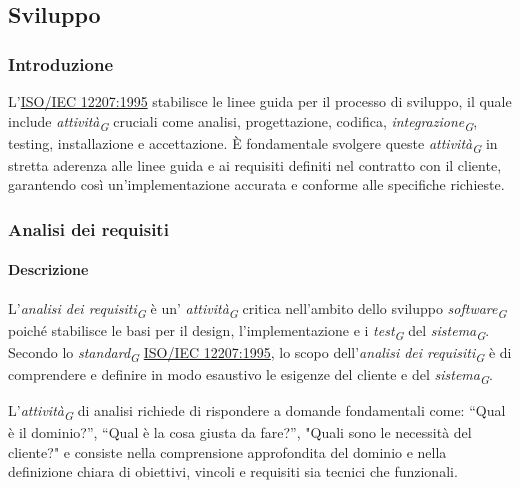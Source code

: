 \subsection{Sviluppo}

\subsubsection{Introduzione}
L'\href{https://www.math.unipd.it/~tullio/IS-1/2009/Approfondimenti/ISO_12207-1995.pdf}{ISO/IEC 12207:1995} stabilisce le linee guida per il processo di sviluppo, il quale include \textit{attività}\textsubscript{\textit{G}} cruciali come analisi, progettazione, codifica, \textit{integrazione}\textsubscript{\textit{G}}, testing, installazione e accettazione. È fondamentale svolgere queste \textit{attività}\textsubscript{\textit{G}} in stretta aderenza alle linee guida e ai requisiti definiti nel contratto con il cliente, garantendo così un'implementazione accurata e conforme alle specifiche richieste.

\subsubsection{Analisi dei requisiti}
\paragraph{Descrizione}
L'\textit{analisi dei requisiti}\textsubscript{\textit{G}} è un' \textit{attività}\textsubscript{\textit{G}} critica nell'ambito dello sviluppo \textit{software}\textsubscript{\textit{G}} poiché stabilisce le basi per il design, l'implementazione e i \textit{test}\textsubscript{\textit{G}} del \textit{sistema}\textsubscript{\textit{G}}. \\
Secondo lo \textit{standard}\textsubscript{\textit{G}} \href{https://www.math.unipd.it/~tullio/IS-1/2009/Approfondimenti/ISO_12207-1995.pdf}{ISO/IEC 12207:1995}, lo scopo dell'\textit{analisi dei requisiti}\textsubscript{\textit{G}} è di comprendere e definire in modo esaustivo le esigenze del cliente e del \textit{sistema}\textsubscript{\textit{G}}.

\vspace{0.2cm}

L’\textit{attività}\textsubscript{\textit{G}} di analisi richiede di rispondere a domande fondamentali come: “Qual è il dominio?”, “Qual è la cosa giusta da fare?”, "Quali sono le necessità del cliente?" e consiste nella comprensione approfondita del dominio e nella definizione chiara di obiettivi, vincoli e requisiti sia tecnici che funzionali.

